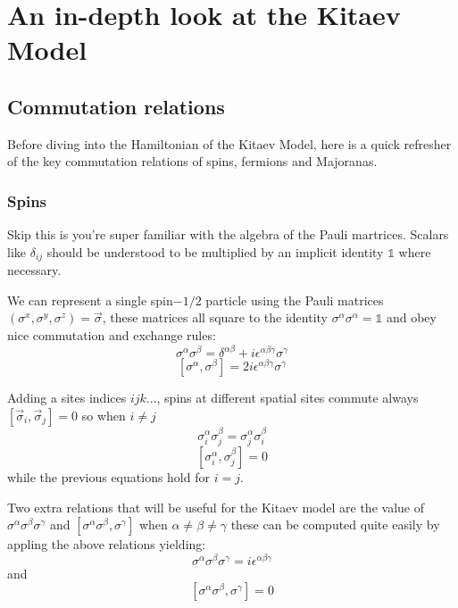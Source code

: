 \hypertarget{an-in-depth-look-at-the-kitaev-model}{%
\section{An in-depth look at the Kitaev
Model}\label{an-in-depth-look-at-the-kitaev-model}}

\hypertarget{commutation-relations}{%
\subsection{Commutation relations}\label{commutation-relations}}

Before diving into the Hamiltonian of the Kitaev Model, here is a quick
refresher of the key commutation relations of spins, fermions and
Majoranas.

\hypertarget{spins}{%
\subsubsection{Spins}\label{spins}}

Skip this is you're super familiar with the algebra of the Pauli
martrices. Scalars like \(\delta_{ij}\) should be understood to be
multiplied by an implicit identity \(\mathbb{1}\) where necessary.

We can represent a single spin\(-1/2\) particle using the Pauli matrices
\((\sigma^x, \sigma^y, \sigma^z) = \vec{\sigma}\), these matrices all
square to the identity \(\sigma^\alpha \sigma^\alpha = \mathbb{1}\) and
obey nice commutation and exchange rules:
\[\sigma^\alpha \sigma^\beta = \delta^{\alpha \beta} + i \epsilon^{\alpha \beta \gamma} \sigma^\gamma\]
\[[\sigma^\alpha, \sigma^\beta] = 2 i \epsilon^{\alpha \beta \gamma} \sigma^\gamma\]

Adding a sites indices \(ijk...\), spins at different spatial sites
commute always \([\vec{\sigma}_i, \vec{\sigma}_j] = 0\) so when
\(i \neq j\)
\[\sigma_i^\alpha \sigma_j^\beta = \sigma_j^\alpha \sigma_i^\beta\]
\[[\sigma_i^\alpha, \sigma_j^\beta] = 0\] while the previous equations
hold for \(i = j\).

Two extra relations that will be useful for the Kitaev model are the
value of \(\sigma^\alpha \sigma^\beta \sigma^\gamma\) and
\([\sigma^\alpha \sigma^\beta, \sigma^\gamma]\) when
\(\alpha \neq \beta \neq \gamma\) these can be computed quite easily by
appling the above relations yielding:
\[\sigma^\alpha \sigma^\beta \sigma^\gamma = i \epsilon^{\alpha\beta\gamma}\]
and \[[\sigma^\alpha \sigma^\beta, \sigma^\gamma] = 0\]

